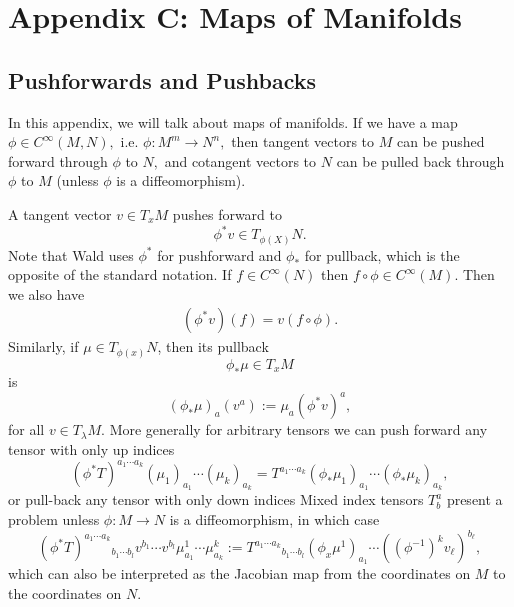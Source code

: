 \documentclass{article}
\numberwithin{equation}{section}
\begin{document}
\section{Appendix C: Maps of Manifolds}
\subsection{Pushforwards and Pushbacks}
In this appendix, we will talk about maps of manifolds. If we have a map $\phi \in C^{\infty}(M,N),$ i.e. $\phi:M^m\to N^n,$ then tangent vectors to $M$ can be pushed forward through $\phi$ to $N,$ and cotangent vectors to $N$ can be pulled back through $\phi$ to $M$ (unless $\phi$ is a diffeomorphism).

A tangent vector $v\in T_x M$ pushes forward to 
\begin{equation*}
    \phi^* v \in T_{\phi(X)}N.
\end{equation*}
Note that Wald uses $\phi^*$ for pushforward and $\phi_*$ for pullback, which is the opposite of the standard notation. If $f\in C^\infty(N)$ then $f\circ \phi\in C^{\infty}(M).$ Then we also have 
\begin{align*}
    (\phi^* v)(f) = v(f\circ \phi).
\end{align*}
Similarly, if $\mu \in T_{\phi(x)}N$, then its pullback 
\begin{equation*}
    \phi_*\mu \in T_xM
\end{equation*}
is 
\begin{equation*}
    (\phi_*\mu)_a(v^a) := \mu_a(\phi^*v)^a,
\end{equation*}
for all $v\in T_{\lambda}M.$ More generally for arbitrary tensors we can push forward any tensor with only up indices
\begin{equation*}
    (\phi^*T)^{a_1\cdots a_k}{}{(\mu_1)_{a_1}\cdots (\mu_k)_{a_k}} = T^{a_1\cdots a_k}(\phi_* \mu_1)_{a_1}\cdots (\phi_* \mu_k)_{a_k},
\end{equation*}
or pull-back any tensor with only down indices Mixed index tensors $T^{a}_{b}$ present a problem unless $\phi:M\to N$ is a diffeomorphism, in which case 
\begin{equation*}
    (\phi^* T)^{a_1\cdots a_k}{}_{b_1\cdots b_l}v^{b_1}\cdots v^{b_l} \mu^1_{a_1}\cdots \mu^k_{a_k} := T^{a_1\cdots a_k}{}_{b_1\cdots b_l} (\phi_x \mu^1)_{a_1}\cdots \left(\left(\phi^{-1}\right)^{k}v_\ell\right)^{b_\ell},
\end{equation*}
which can also be interpreted as the Jacobian map from the coordinates on $M$ to the coordinates on $N.$
\end{document}
